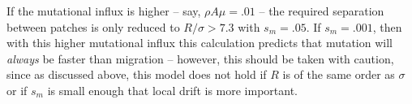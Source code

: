\documentclass{article}
\newcommand{\linelabel}[1]{}
\newcommand{\migrate}{\lambda_\text{mig}}
\newcommand{\mutrate}{\lambda_\text{mut}}
\newcommand{\Tmig}{T_\text{mig}}
\newcommand{\Tmut}{T_\text{mut}}
\begin{document}
If the mutational influx is higher -- say, $\rho A \mu = .01$ --
the required separation between patches is only reduced to $R/\sigma > 7.3$ with $s_m=.05$.
If $s_m=.001$, then with this higher mutational influx this calculation predicts that mutation will \emph{always} be faster than migration
-- however, this should be taken with caution,
since as discussed above, this model does not hold if $R$ is of the same order as $\sigma$
or if $s_m$ is small enough that local drift is more important.
\linelabel{rr:separated_patches}

% 
\end{document}
